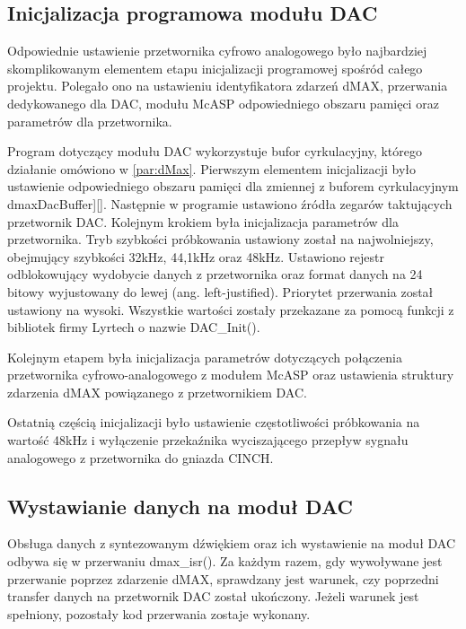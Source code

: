 \subsection{Inicjalizacja programowa modułu DAC}
Odpowiednie ustawienie przetwornika cyfrowo analogowego było najbardziej skomplikowanym elementem etapu inicjalizacji programowej spośród całego projektu. Polegało ono na ustawieniu identyfikatora zdarzeń dMAX, przerwania dedykowanego dla DAC, modułu McASP odpowiedniego obszaru pamięci oraz parametrów dla przetwornika. 

Program dotyczący modułu DAC wykorzystuje bufor cyrkulacyjny, którego działanie omówiono w \ref{par:dMax}. Pierwszym elementem inicjalizacji było ustawienie odpowiedniego obszaru pamięci dla zmiennej z buforem cyrkulacyjnym dmaxDacBuffer][]. Następnie w programie ustawiono źródła zegarów taktujących przetwornik DAC. Kolejnym krokiem była inicjalizacja parametrów dla przetwornika. Tryb szybkości próbkowania ustawiony został na najwolniejszy, obejmujący szybkości 32kHz, 44,1kHz oraz 48kHz. Ustawiono rejestr odblokowujący wydobycie danych z przetwornika oraz format danych na 24 bitowy wyjustowany do lewej (ang. left-justified). Priorytet przerwania został ustawiony na wysoki. Wszystkie wartości zostały przekazane za pomocą funkcji z bibliotek firmy Lyrtech o nazwie DAC\_Init().

Kolejnym etapem była inicjalizacja parametrów dotyczących połączenia przetwornika cyfrowo-analogowego z modułem McASP oraz ustawienia struktury zdarzenia dMAX powiązanego z przetwornikiem DAC. 

Ostatnią częścią inicjalizacji było ustawienie częstotliwości próbkowania na wartość 48kHz i wyłączenie przekaźnika wyciszającego przepływ sygnału analogowego z przetwornika do gniazda CINCH.

\subsection{Wystawianie danych na moduł DAC}
Obsługa danych z syntezowanym dźwiękiem oraz ich wystawienie na moduł DAC odbywa się w przerwaniu dmax\_isr(). Za każdym razem, gdy wywoływane jest przerwanie poprzez zdarzenie dMAX, sprawdzany jest warunek, czy poprzedni transfer danych na przetwornik DAC został ukończony. Jeżeli warunek jest spełniony, pozostały kod przerwania zostaje wykonany.

